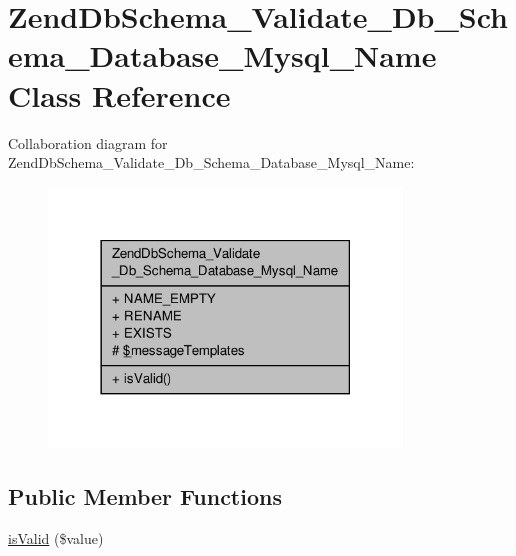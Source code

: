 \hypertarget{classZendDbSchema__Validate__Db__Schema__Database__Mysql__Name}{\section{Zend\-Db\-Schema\-\_\-\-Validate\-\_\-\-Db\-\_\-\-Schema\-\_\-\-Database\-\_\-\-Mysql\-\_\-\-Name Class Reference}
\label{classZendDbSchema__Validate__Db__Schema__Database__Mysql__Name}
}


Collaboration diagram for Zend\-Db\-Schema\-\_\-\-Validate\-\_\-\-Db\-\_\-\-Schema\-\_\-\-Database\-\_\-\-Mysql\-\_\-\-Name\-:\nopagebreak
\begin{figure}[H]
\begin{center}
\leavevmode
\includegraphics[width=266pt]{classZendDbSchema__Validate__Db__Schema__Database__Mysql__Name__coll__graph}
\end{center}
\end{figure}
\subsection*{Public Member Functions}
\begin{DoxyCompactItemize}
\item 
\hyperlink{classZendDbSchema__Validate__Db__Schema__Database__Mysql__Name_a24d592903d729f2f98d3035471ad5538}{is\-Valid} (\$value)
\end{DoxyCompactItemize}
